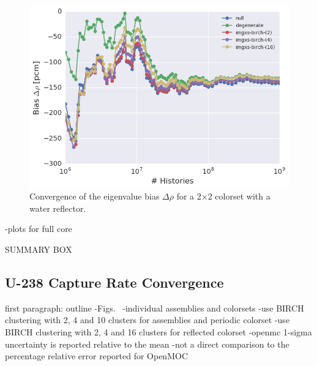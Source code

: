 \begin{figure}[h!]
\centering
\includegraphics[width=0.87\linewidth]{figures/results/convergence/reflector/keff-bias-evo}
\vspace{2mm}
\caption[Eigenvalue bias covergence for a 2$\times$2 colorset with reflector]{Convergence of the eigenvalue bias $\Delta\rho$ for a 2$\times$2 colorset with a water reflector.}
\label{fig:chap11-refl-eigenvalue-converge}
\end{figure}

-plots for full core

SUMMARY BOX

\subsection{U-238 Capture Rate Convergence}
\label{subsec:chap11-capture-converge}

first paragraph: outline
-Figs.~
  -individual assemblies and colorsets
-use BIRCH clustering with 2, 4 and 10 clusters for assemblies and periodic colorset
-use BIRCH clustering with 2, 4 and 16 clusters for reflected colorset
-openmc 1-sigma uncertainty is reported relative to the mean
  -not a direct comparison to the percentage relative error reported for OpenMOC

